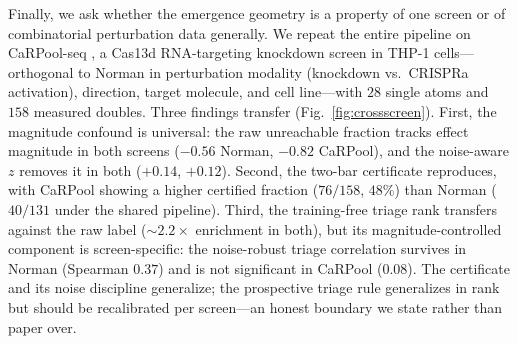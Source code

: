 Finally, we ask whether the emergence geometry is a property of one screen or of combinatorial
perturbation data generally. We repeat the entire pipeline on CaRPool-seq \citep{Wessels2023}, a
Cas13d RNA-targeting knockdown screen in THP-1 cells---orthogonal to Norman in perturbation modality
(knockdown vs.\ CRISPRa activation), direction, target molecule, and cell line---with $28$ single
atoms and $158$ measured doubles. Three findings transfer (Fig.~\ref{fig:crossscreen}). First, the
magnitude confound is universal: the raw unreachable fraction tracks effect magnitude in both
screens ($-0.56$ Norman, $-0.82$ CaRPool), and the noise-aware $z$ removes it in both ($+0.14$,
$+0.12$). Second, the two-bar certificate reproduces, with CaRPool showing a higher certified
fraction ($76/158$, $48\%$) than Norman ($40/131$ under the shared pipeline). Third, the
training-free triage rank transfers against the raw label ($\sim\!2.2\times$ enrichment in both),
but its magnitude-controlled component is screen-specific: the noise-robust triage correlation
survives in Norman (Spearman $0.37$) and is not significant in CaRPool ($0.08$). The certificate and
its noise discipline generalize; the prospective triage rule generalizes in rank but should be
recalibrated per screen---an honest boundary we state rather than paper over.
